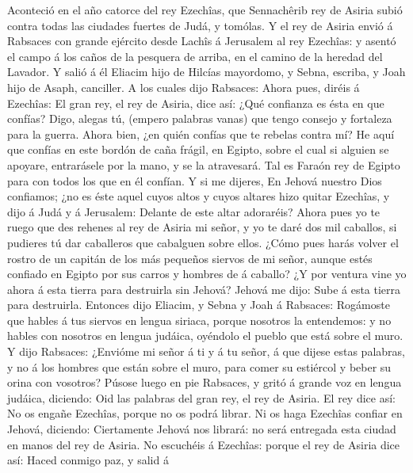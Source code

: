 Aconteció en el año catorce del rey Ezechîas, que
Sennachêrib rey de Asiria subió contra todas las ciudades fuertes de
Judá, y tomólas.  Y el rey de Asiria envió á Rabsaces con
grande ejército desde Lachîs á Jerusalem al rey Ezechîas: y asentó el
campo á los caños de la pesquera de arriba, en el camino de la heredad
del Lavador.  Y salió á él Eliacim hijo de Hilcías
mayordomo, y Sebna, escriba, y Joah hijo de Asaph, canciller.
 A los cuales dijo Rabsaces: Ahora pues, diréis á
Ezechîas: El gran rey, el rey de Asiria, dice así: ¿Qué confianza es
ésta en que confías?  Digo, alegas tú, (empero palabras
vanas) que tengo consejo y fortaleza para la guerra. Ahora bien, ¿en
quién confías que te rebelas contra mí?  He aquí que
confías en este bordón de caña frágil, en Egipto, sobre el cual si
alguien se apoyare, entrarásele por la mano, y se la atravesará. Tal es
Faraón rey de Egipto para con todos los que en él confían.
 Y si me dijeres, En Jehová nuestro Dios confiamos; ¿no es
éste aquel cuyos altos y cuyos altares hizo quitar Ezechîas, y dijo á
Judá y á Jerusalem: Delante de este altar adoraréis? 
Ahora pues yo te ruego que des rehenes al rey de Asiria mi señor, y yo
te daré dos mil caballos, si pudieres tú dar caballeros que cabalguen
sobre ellos.  ¿Cómo pues harás volver el rostro de un
capitán de los más pequeños siervos de mi señor, aunque estés confiado
en Egipto por sus carros y hombres de á caballo?  ¿Y por
ventura vine yo ahora á esta tierra para destruirla sin Jehová? Jehová
me dijo: Sube á esta tierra para destruirla.  Entonces
dijo Eliacim, y Sebna y Joah á Rabsaces: Rogámoste que hables á tus
siervos en lengua siriaca, porque nosotros la entendemos: y no hables
con nosotros en lengua judáica, oyéndolo el pueblo que está sobre el
muro.  Y dijo Rabsaces: ¿Envióme mi señor á ti y á tu
señor, á que dijese estas palabras, y no á los hombres que están sobre
el muro, para comer su estiércol y beber su orina con vosotros?
 Púsose luego en pie Rabsaces, y gritó á grande voz en
lengua judáica, diciendo: Oid las palabras del gran rey, el rey de
Asiria.  El rey dice así: No os engañe Ezechîas, porque
no os podrá librar.  Ni os haga Ezechîas confiar en
Jehová, diciendo: Ciertamente Jehová nos librará: no será entregada esta
ciudad en manos del rey de Asiria.  No escuchéis á
Ezechîas: porque el rey de Asiria dice así: Haced conmigo paz, y salid á
